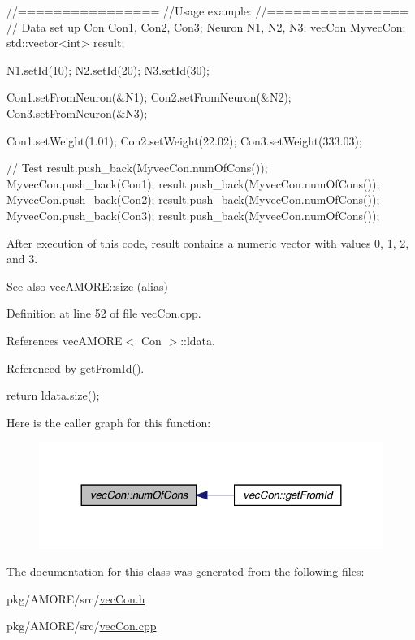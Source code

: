 \begin{DoxyCode}
  //================
  //Usage example:
  //================
        // Data set up
                Con Con1, Con2, Con3;
                Neuron N1, N2, N3;
                vecCon MyvecCon;
                std::vector<int> result;

                N1.setId(10);
                N2.setId(20);
                N3.setId(30);

                Con1.setFromNeuron(&N1);
                Con2.setFromNeuron(&N2);
                Con3.setFromNeuron(&N3);

                Con1.setWeight(1.01);
                Con2.setWeight(22.02);
                Con3.setWeight(333.03);

        // Test
                result.push_back(MyvecCon.numOfCons());
                MyvecCon.push_back(Con1);
                result.push_back(MyvecCon.numOfCons());
                MyvecCon.push_back(Con2);
                result.push_back(MyvecCon.numOfCons());
                MyvecCon.push_back(Con3);
                result.push_back(MyvecCon.numOfCons());
\end{DoxyCode}


After execution of this code, result contains a numeric vector with values 0, 1, 2, and 3.

\begin{DoxySeeAlso}{See also}
\hyperlink{classvec_a_m_o_r_e_ae1289a7870dbdd19b6455a890e94ce48}{vecAMORE::size} (alias) 
\end{DoxySeeAlso}


Definition at line 52 of file vecCon.cpp.



References vecAMORE$<$ Con $>$::ldata.



Referenced by getFromId().


\begin{DoxyCode}
                       {
        return ldata.size();
}
\end{DoxyCode}


Here is the caller graph for this function:\nopagebreak
\begin{figure}[H]
\begin{center}
\leavevmode
\includegraphics[width=324pt]{classvec_con_a1e39a5e78c40ae8af9bbd2fd7f0dc749_icgraph}
\end{center}
\end{figure}




The documentation for this class was generated from the following files:\begin{DoxyCompactItemize}
\item 
pkg/AMORE/src/\hyperlink{vec_con_8h}{vecCon.h}\item 
pkg/AMORE/src/\hyperlink{vec_con_8cpp}{vecCon.cpp}\end{DoxyCompactItemize}
